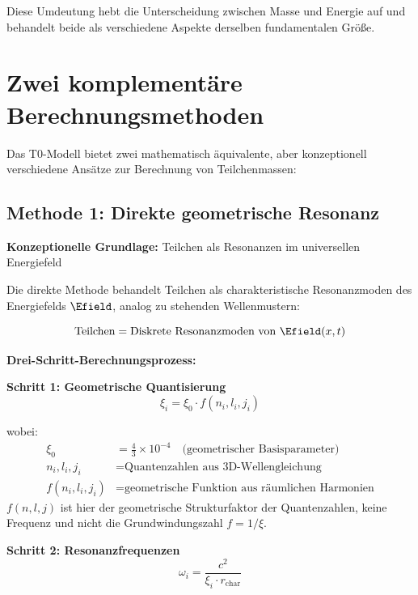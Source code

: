 	Diese Umdeutung hebt die Unterscheidung zwischen Masse und Energie auf und behandelt beide als verschiedene Aspekte derselben fundamentalen Größe.
	
	\section{Zwei komplementäre Berechnungsmethoden}
	\label{sec:two_calculation_methods}
	
	Das T0-Modell bietet zwei mathematisch äquivalente, aber konzeptionell verschiedene Ansätze zur Berechnung von Teilchenmassen:
	
	\subsection{Methode 1: Direkte geometrische Resonanz}
	\label{subsec:direct_geometric_method}
	
	\textbf{Konzeptionelle Grundlage:} Teilchen als Resonanzen im universellen Energiefeld
	
	Die direkte Methode behandelt Teilchen als charakteristische Resonanzmoden des Energiefelds $\Efield$, analog zu stehenden Wellenmustern:
	
	\begin{equation}
		\text{Teilchen} = \text{Diskrete Resonanzmoden von } \Efield(x,t)
	\end{equation}
	
	\textbf{Drei-Schritt-Berechnungsprozess:}
	
	\textbf{Schritt 1: Geometrische Quantisierung}
	\begin{equation}
		\xi_i = \xi_0 \cdot f(n_i, l_i, j_i)
		\label{eq:geometric_quantization}
	\end{equation}

	wobei:
	\begin{align}
		\xi_0 &= \frac{4}{3} \times 10^{-4} \quad \text{(geometrischer Basisparameter)} \\
		n_i, l_i, j_i &= \text{Quantenzahlen aus 3D-Wellengleichung} \\
		f(n_i, l_i, j_i) &= \text{geometrische Funktion aus räumlichen Harmonien}
	\end{align}
	$f(n,l,j)$ ist hier der geometrische Strukturfaktor der Quantenzahlen, keine Frequenz und nicht die Grundwindungszahl $f = 1/\xi$.
	
	\textbf{Schritt 2: Resonanzfrequenzen}
	\begin{equation}
		\omega_i = \frac{c^2}{\xi_i \cdot r_{\text{char}}}
		\label{eq:resonance_frequencies}
	\end{equation}
	

